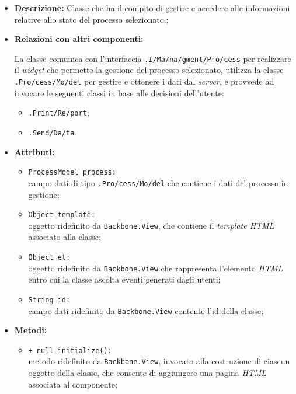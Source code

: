 \begin{flushleft}
\begin{itemize}
\item \textbf{Descrizione:} Classe che ha il compito di gestire e accedere alle informazioni relative allo stato del processo selezionato.;
\item \textbf{Relazioni con altri componenti:}
\begin{sloppypar}
La classe comunica con l'interfaccia \texttt{\viewUser{}.I\fshyp{}Ma\fshyp{}na\fshyp{}gment\fshyp{}Pro\fshyp{}cess} per realizzare il \textit{widget} che permette la gestione del processo selezionato, utilizza la classe \texttt{\model{}.Pro\fshyp{}cess\fshyp{}Mo\fshyp{}del} per gestire e ottenere i dati dal \textit{server}, e provvede ad invocare le seguenti classi in base alle decisioni dell'utente:
\begin{itemize}
\item \texttt{\logicUser{}.Print\fshyp{}Re\fshyp{}port};
\item \texttt{\logicUser{}.Send\fshyp{}Da\fshyp{}ta}.
\end{itemize}
\end{sloppypar}
\item \textbf{Attributi:}
\begin{sloppypar}
\begin{itemize}
\item \texttt{ProcessModel process:}\\ campo dati di tipo \texttt{\model{}.Pro\fshyp{}cess\fshyp{}Mo\fshyp{}del} che contiene i dati del processo in gestione;
\item \texttt{Object template:}\\ oggetto ridefinito da \texttt{Backbone.View}, che contiene il \textit{template HTML} associato alla classe;
\item \texttt{Object el:}\\ oggetto ridefinito da \texttt{Backbone.View} che rappresenta l'elemento \textit{HTML} entro cui la classe ascolta eventi generati dagli utenti;
\item \texttt{String id:}\\ campo dati ridefinito da \texttt{Backbone.View} contente l'id della classe;
\end{itemize}
\end{sloppypar}
\item \textbf{Metodi:}
\begin{sloppypar}
\begin{itemize}
\item \texttt{+ null initialize():}\\ metodo ridefinito da \texttt{Backbone.View}, invocato alla costruzione di ciascun oggetto della classe, che consente di aggiungere una pagina \textit{HTML} associata al componente;

\end{itemize}
\end{sloppypar}
\end{itemize}
\end{flushleft}

